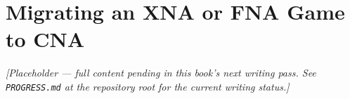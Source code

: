 \chapter{Migrating an XNA or FNA Game to CNA}
\label{ch:migration-guide}

\emph{[Placeholder --- full content pending in this book's next writing pass. See \texttt{PROGRESS.md} at the repository root for the current writing status.]}
